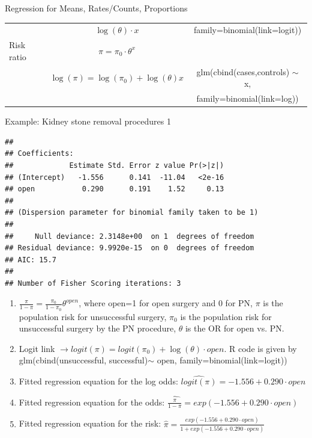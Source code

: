 \documentclass[handout]{beamer}\usepackage[]{graphicx}\usepackage[]{color}
\newenvironment{knitrout}{}{} %
\begin{document}
\begin{frame}{Regression for Means, Rates/Counts, Proportions}
{\begin{center}
\begin{tabular}{|l|c|c|}
& $\log(\theta)\cdot x$ & family=binomial(link=logit))\\
\Xhline{.1\arrayrulewidth}						
\hspace{0.2cm} Risk ratio &  $\pi = \pi_0 \cdot \theta^x$   & \\
& $\log(\pi) = \log(\pi_0) + \log(\theta) x$ & glm(cbind(cases,controls) $\sim$ x, \\
&  & family=binomial(link=log))\\							
\hline
		\end{tabular}
	\end{center}
}
\end{frame}



\begin{frame}[fragile]{Example: Kidney stone removal procedures 1}

\begin{knitrout}\tiny
{}\color{fgcolor}
\begin{verbatim}
## 
## Coefficients:
##             Estimate Std. Error z value Pr(>|z|)
## (Intercept)   -1.556      0.141  -11.04   <2e-16
## open           0.290      0.191    1.52     0.13
## 
## (Dispersion parameter for binomial family taken to be 1)
## 
##     Null deviance: 2.3148e+00  on 1  degrees of freedom
## Residual deviance: 9.9920e-15  on 0  degrees of freedom
## AIC: 15.7
## 
## Number of Fisher Scoring iterations: 3
\end{verbatim}

\end{knitrout}

\scriptsize
\begin{enumerate}
	\item $\frac{\pi}{1-\pi} = \frac{\pi_0}{1-\pi_0} \theta^{open}$, where open=1 for open surgery and 0 for PN, $\pi$ is the population risk for unsuccessful surgery, $\pi_0$ is the population risk for unsuccessful surgery by the PN procedure, $\theta$ is the OR for open vs. PN.  \pause
	\item Logit link $\to logit(\pi) = logit(\pi_0) + \log(\theta) \cdot open$. R code is given by glm(cbind(unsuccessful, successful)$\sim$ open, family=binomial(link=logit))  \pause
	\item Fitted regression equation for the log odds: $\widehat{logit(\pi)} = -1.556 + 0.290 \cdot open$ \pause
		\item Fitted regression equation for the odds: $\widehat{\frac{\pi}{1-\pi}} = exp(-1.556 + 0.290 \cdot open)$ \pause
				\item Fitted regression equation for the risk: $\widehat{\pi} = \frac{exp(-1.556 + 0.290 \cdot open)}{1+exp(-1.556 + 0.290 \cdot open)}$
\end{enumerate}

\end{frame}
\end{document}
